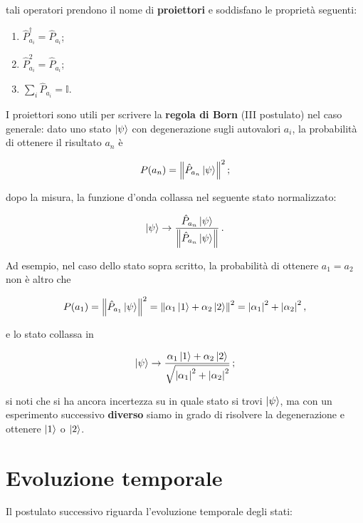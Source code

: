 \noindent tali operatori prendono il nome di \textbf{proiettori} e soddisfano le proprietà seguenti:  
\begin{enumerate}
    \item $\hat P_{a_i}^\dagger = \hat P_{a_i}$;
    \item $\hat P_{a_i}^2 = \hat P_{a_i}$;
    \item $\sum_i \hat P_{a_i} = \mathbb{I}$. 
\end{enumerate}

\noindent I proiettori sono utili per scrivere la \textbf{regola di Born} (III postulato) nel caso generale: dato uno stato $\ket{\psi}$ con degenerazione sugli autovalori $a_i$, la probabilità di ottenere il risultato $a_n$ è

\begin{equation*}
    P(a_n) = \norm{\hat{P}_{a_n} \ket{\psi}}^2 \, ;
\end{equation*}

\noindent dopo la misura, la funzione d'onda collassa nel seguente stato normalizzato:

\begin{equation*}
    \ket{\psi} \rightarrow \frac{\hat{P}_{a_n} \ket{\psi}}{\norm{\hat{P}_{a_n} \ket{\psi}}} \, .
\end{equation*}

\noindent Ad esempio, nel caso dello stato sopra scritto, la probabilità di ottenere $a_1 = a_2$ non è altro che 

\begin{equation*}
    P(a_1) = \norm{\hat{P}_{a_1} \ket{\psi}}^2 = \norm{\alpha_1 \ket{1} + \alpha_2 \ket{2}}^2 = \abs{\alpha_1}^2 + \abs{\alpha_2}^2 \, ,
\end{equation*}

\noindent e lo stato collassa in

\begin{equation*}
    \ket{\psi} \rightarrow \frac{\alpha_1 \ket{1} + \alpha_2 \ket{2}}{\sqrt{\abs{\alpha_1}^2 + \abs{\alpha_2}^2}} \, ;
\end{equation*}

\noindent si noti che si ha ancora incertezza su in quale stato si trovi $\ket{\psi}$, ma con un esperimento successivo \textbf{diverso} siamo in grado di risolvere la degenerazione e ottenere $\ket{1}$ o $\ket{2}$. 

\section{Evoluzione temporale}
Il postulato successivo riguarda l'evoluzione temporale degli stati:

